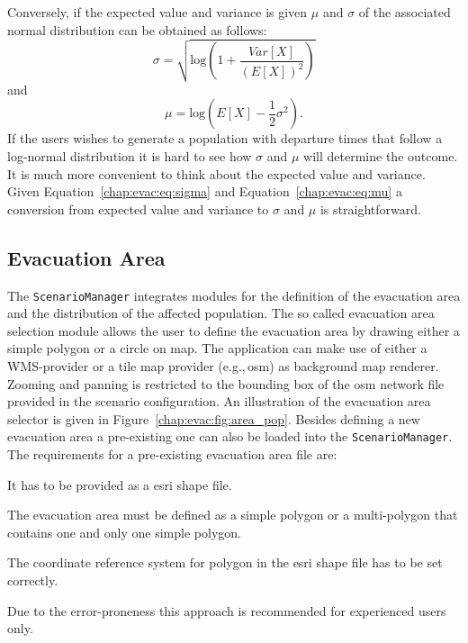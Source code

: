 Conversely, if the expected value and variance is given $\mu$ and $\sigma$ of the associated normal distribution can be obtained as follows:
\begin{equation}
\sigma = \sqrt{\text{log}(1+\frac{Var[X]}{(E[X])^2})}\label{chap:evac:eq:sigma}
\end{equation}
and 
\begin{equation}
\mu = \text{log}(E[X] - \frac{1}{2}\sigma^2).\label{chap:evac:eq:mu}
\end{equation}
If the users wishes to generate a population with departure times that follow a log-normal distribution it is hard to see how $\sigma$ and $\mu$ will determine the outcome. It is much more convenient to think about the expected value and variance. Given Equation~\ref{chap:evac:eq:sigma} and Equation~\ref{chap:evac:eq:mu} a conversion from expected value and variance to $\sigma$ and $\mu$ is straightforward.

\subsection{Evacuation Area}%
The \lstinline|ScenarioManager| integrates modules for the definition of the evacuation area and the distribution of the affected population. The so called evacuation area selection module allows the user to define the evacuation area by drawing either a simple polygon or a circle on map. The application can make use of either a WMS-provider or a tile map provider (e.g.,\,\gls{osm}) as background map renderer. Zooming and panning is restricted to the bounding box of the \gls{osm} network file provided in the scenario configuration. An illustration of the evacuation area selector is given in Figure~\ref{chap:evac:fig:area_pop}. Besides defining a new evacuation area a pre-existing one can also be loaded into the \lstinline|ScenarioManager|. The requirements for a pre-existing evacuation area file are:
\begin{compactitem}
\item It has to be provided as a \gls{esri} shape file.
\item The evacuation area must be defined as a simple polygon or a multi-polygon that contains one and only one simple polygon.
\item The coordinate reference system for polygon in the \gls{esri} shape file has to be set correctly. 
\end{compactitem}
Due to the error-proneness this approach is recommended for experienced users only.

